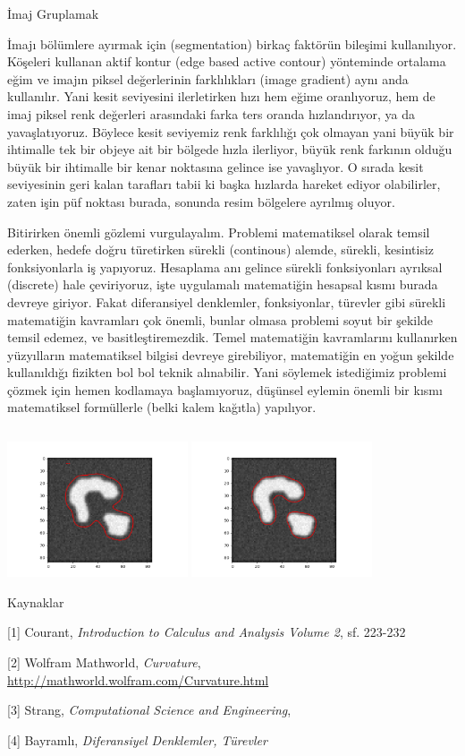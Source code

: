 \documentclass[12pt,fleqn]{article}\usepackage{../../common}
\begin{document}
İmaj Gruplamak

İmajı bölümlere ayırmak için (segmentation) birkaç faktörün bileşimi
kullanılıyor. Köşeleri kullanan aktif kontur (edge based active contour)
yönteminde ortalama eğim ve imajın piksel değerlerinin farklılıkları (image
gradient) aynı anda kullanılır. Yani kesit seviyesini ilerletirken hızı hem
eğime oranlıyoruz, hem de imaj piksel renk değerleri arasındaki farka ters
oranda hızlandırıyor, ya da yavaşlatıyoruz. Böylece kesit seviyemiz renk
farklılığı çok olmayan yani büyük bir ihtimalle tek bir objeye ait bir
bölgede hızla ilerliyor, büyük renk farkının olduğu büyük bir ihtimalle bir
kenar noktasına gelince ise yavaşlıyor. O sırada kesit seviyesinin geri
kalan tarafları tabii ki başka hızlarda hareket ediyor olabilirler, zaten
işin püf noktası burada, sonunda resim bölgelere ayrılmış oluyor.

Bitirirken önemli gözlemi vurgulayalım. Problemi matematiksel olarak temsil
ederken, hedefe doğru türetirken sürekli (continous) alemde, sürekli,
kesintisiz fonksiyonlarla iş yapıyoruz. Hesaplama anı gelince sürekli
fonksiyonları ayrıksal (discrete) hale çeviriyoruz, işte uygulamalı
matematiğin hesapsal kısmı burada devreye giriyor. Fakat diferansiyel
denklemler, fonksiyonlar, türevler gibi sürekli matematiğin kavramları çok
önemli, bunlar olmasa problemi soyut bir şekilde temsil edemez, ve
basitleştiremezdik. Temel matematiğin kavramlarını kullanırken yüzyılların
matematiksel bilgisi devreye girebiliyor, matematiğin en yoğun şekilde
kullanıldığı fizikten bol bol teknik alınabilir. Yani söylemek istediğimiz
problemi çözmek için hemen kodlamaya başlamıyoruz, düşünsel eylemin önemli
bir kısmı matematiksel formüllerle (belki kalem kağıtla) yapılıyor.

\inputminted[fontsize=\footnotesize]{python}{levelset2o.py}

\includegraphics[height=4cm]{img1/level_2_040.png}
\includegraphics[height=4cm]{img1/level_2_100.png}

Kaynaklar

[1] Courant, {\em Introduction to Calculus and Analysis Volume 2}, sf. 223-232

[2] Wolfram Mathworld, {\em Curvature}, \url{http://mathworld.wolfram.com/Curvature.html}

[3] Strang, {\em Computational Science and Engineering},

[4] Bayramlı, {\em Diferansiyel Denklemler, Türevler}
\end{document}
